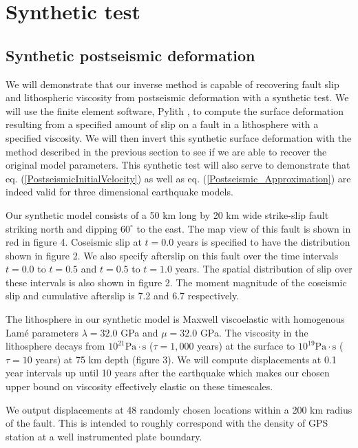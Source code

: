 \documentclass[12pt]{article}
\begin{document}
\section{Synthetic test}
\subsection{Synthetic postseismic deformation}

We will demonstrate that our inverse method is capable of recovering
fault slip and lithospheric viscosity from postseismic deformation
with a synthetic test.  We will use the finite element software,
Pylith \citep{A2007}, to compute the surface deformation resulting from
a specified amount of slip on a fault in a lithosphere with a
specified viscosity.  We will then invert this synthetic surface
deformation with the method described in the previous section to see
if we are able to recover the original model parameters.  This
synthetic test will also serve to demonstrate that
eq. (\ref{PostseismicInitialVelocity}) as well as
eq. (\ref{Postseismic_Approximation}) are indeed valid for three
dimensional earthquake models.

Our synthetic model consists of a 50 km long by 20 km wide strike-slip
fault striking north and dipping $60^{\circ}$ to the east.  The map
view of this fault is shown in red in figure 4. Coseismic slip at
$t=0.0$ years is specified to have the distribution shown in figure 2.
We also specify afterslip on this fault over the time intervals
$t=0.0$ to $t=0.5$ and $t=0.5$ to $t=1.0$ years.  The spatial
distribution of slip over these intervals is also shown in figure 2.  The
moment magnitude of the coseismic slip and cumulative afterslip is 7.2
and 6.7 respectively.

The lithosphere in our synthetic model is Maxwell viscoelastic with
homogenous Lam\'e parameters $\lambda = 32.0$ GPa and $\mu = 32.0$
GPa.  The viscosity in the lithosphere decays from
$10^{21}\mathrm{Pa}\cdot\mathrm{s}$ ($\tau = 1,000$ years) at the
surface to $10^{19}\mathrm{Pa}\cdot\mathrm{s}$ ($\tau = 10$ years) at
75 km depth (figure 3).  We will compute displacements at 0.1 year
intervals up until 10 years after the earthquake which makes our
chosen upper bound on viscosity effectively elastic on these
timescales.

We output displacements at 48 randomly chosen locations within a 200
km radius of the fault.  This is intended to roughly correspond with the
density of GPS station at a well instrumented plate boundary.
\end{document}
